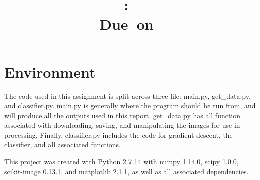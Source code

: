 \documentclass{article}
\title{
	\vspace{2in}
	\textmd{\textbf{\hmwkClass:\ \hmwkTitle}}\\
	\normalsize\vspace{0.1in}\small{Due\ on\ \hmwkDueDate}\\
	\vspace{0.1in}
	\vspace{3in}
}
\author{\textbf{\hmwkAuthorName}}
\newcommand{\enterproblemHeader}[1]{
}
\newcommand{\exitproblemHeader}[1]{
}
\newcounter{problem} %
\newcommand{\problemName}{}
\newenvironment{problem}[1][Part \theproblem]{ %
	\stepcounter{problem} %
	\renewcommand{\problemName}{#1} %
	\section{\problemName} %
	\enterproblemHeader{\problemName} %
}{
	\exitproblemHeader{\problemName} %
}
\begin{document}
\maketitle
\clearpage


\begin{problem}[Environment]
	The code used in this assignment is split across three file: main.py, get\_data.py, and classifier.py. main.py is generally where the program should be run from, and will produce all the outputs used in this report. get\_data.py has all function associated with downloading, saving, and manipulating the images for use in processing. Finally, classifier.py includes the code for gradient descent, the classifier, and all associated functions.
	
	This project was created with Python 2.7.14 with numpy 1.14.0, scipy 1.0.0, scikit-image 0.13.1, and matplotlib 2.1.1, as well as all associated dependencies.
\end{problem}
\clearpage
\end{document}
